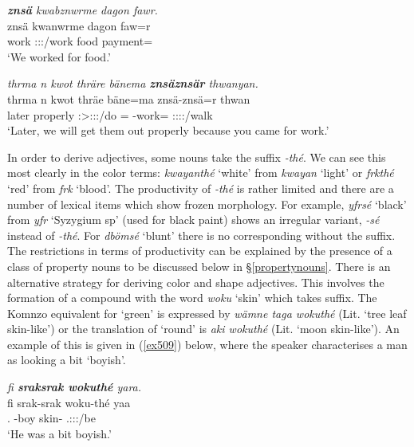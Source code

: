 \begin{exe}
	\ex \emph{\textbf{znsä} kwabznwrme dagon fawr.}\\
	\gll znsä kwanwrme dagon faw=r\\
	work \Fpl:\Sbj:\Pst:\Dur/work food payment=\Purp\\
	\trans `We worked for food.'
	\label{ex503}
\end{exe}
\begin{exe}
	\ex \emph{thrma n kwot thräre bänema \textbf{znsäznsär} thwanyan.}\\
	\gll thrma n kwot thräe bäne=ma znsä-znsä=r thwan\\
	later \Imn{} properly \Fpl:\Sbj>\Stpl:\Obj:\Irr:\Pfv/do \Med=\Char{} \Redup-work=\Purp{} \Stdu:\Sbj:\Rpst:\Ipfv:\Venit/walk\\
	\trans `Later, we will get them out properly because you came for work.'
	\label{ex504}
\end{exe}

In order to derive adjectives, some nouns take the  suffix \emph{-thé}. We can see this most clearly in the color terms: \emph{kwayanthé} `white' from \emph{kwayan} `light' or \emph{frkthé} `red' from \emph{frk} `blood'. The productivity of \emph{-thé} is rather limited and there are a number of lexical items which show frozen morphology. For example, \emph{yfrsé} `black' from \emph{yfr} `Syzygium sp' (used for black paint) shows an irregular variant, \emph{-sé} instead of \emph{-thé}. For \emph{dbömsé} `blunt' there is no corresponding  without the suffix. The restrictions in terms of productivity can be explained by the presence of a class of property nouns to be discussed below in \S{}\ref{propertynouns}. There is an alternative strategy for deriving color and shape adjectives. This involves the formation of a compound with the word \textit{woku} `skin' which takes  suffix. The Komnzo equivalent for  `green' is expressed by \emph{wämne taga wokuthé} (Lit. `tree leaf skin-like') or the translation of `round' is \emph{aki wokuthé} (Lit. `moon skin-like'). An example of this is given in (\ref{ex509}) below, where the speaker characterises a man as looking a bit `boyish'.

\begin{exe}
	\ex \emph{fi \textbf{sraksrak wokuthé} yara.}\\
	\gll fi srak-srak woku-thé yaa\\
	\Third.\Abs{} \Redup-boy skin-\Adlzr{} \Tsg.\Masc:\Sbj:\Pst:\Ipfv/be\\
	\trans `He was a bit boyish.'
	\label{ex509}
\end{exe}

